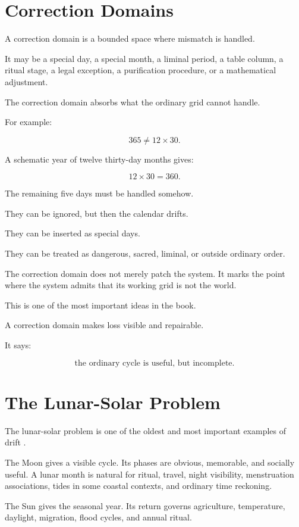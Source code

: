 \documentclass[11pt]{book}
\begin{document}
\section{Correction Domains}

A correction domain is a bounded space where mismatch is handled.

It may be a special day, a special month, a liminal period, a table column, a ritual stage, a legal exception, a purification procedure, or a mathematical adjustment.

The correction domain absorbs what the ordinary grid cannot handle.

For example:

\[
365 \neq 12 \times 30.
\]

A schematic year of twelve thirty-day months gives:

\[
12 \times 30 = 360.
\]

The remaining five days must be handled somehow.

They can be ignored, but then the calendar drifts.

They can be inserted as special days.

They can be treated as dangerous, sacred, liminal, or outside ordinary order.

The correction domain does not merely patch the system. It marks the point where the system admits that its working grid is not the world.

This is one of the most important ideas in the book.

A correction domain makes loss visible and repairable.

It says:

\[
\text{the ordinary cycle is useful, but incomplete}.
\]

\section{The Lunar-Solar Problem}

The lunar-solar problem is one of the oldest and most important examples of drift \cite{Neugebauer1957ExactSciences,Aveni1989EmpiresTime,Parker1950CalendarsEgypt}.

The Moon gives a visible cycle. Its phases are obvious, memorable, and socially useful. A lunar month is natural for ritual, travel, night visibility, menstruation associations, tides in some coastal contexts, and ordinary time reckoning.

The Sun gives the seasonal year. Its return governs agriculture, temperature, daylight, migration, flood cycles, and annual ritual.
\end{document}

